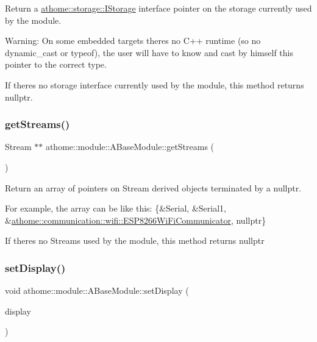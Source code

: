 Return a \mbox{\hyperlink{classathome_1_1storage_1_1_i_storage}{athome\+::storage\+::\+I\+Storage}} interface pointer on the storage currently used by the module.

Warning\+: On some embedded targets there\textquotesingle{}s no C++ runtime (so no {\ttfamily dynamic\+\_\+cast} or {\ttfamily typeof}), the user will have to know and cast by himself this pointer to the correct type.

If there\textquotesingle{}s no storage interface currently used by the module, this method returns {\ttfamily nullptr}. \mbox{\label{classathome_1_1module_1_1_a_base_module_adc612512d2acb7bc3f3d533bcc1aa41b}} 
\subsubsection{\texorpdfstring{get\+Streams()}{getStreams()}}
{\footnotesize\ttfamily Stream $\ast$$\ast$ athome\+::module\+::\+A\+Base\+Module\+::get\+Streams (\begin{DoxyParamCaption}{ }\end{DoxyParamCaption})}

Return an array of pointers on {\ttfamily Stream} derived objects terminated by a {\ttfamily nullptr}.

For example, the array can be like this\+: {\ttfamily \{\&Serial, \&Serial1, \&\mbox{\hyperlink{classathome_1_1communication_1_1wifi_1_1_e_s_p8266_wi_fi_communicator}{athome\+::communication\+::wifi\+::\+E\+S\+P8266\+Wi\+Fi\+Communicator}}, nullptr\}}

If there\textquotesingle{}s no {\ttfamily Stream}s used by the module, this method returns {\ttfamily nullptr} \mbox{\label{classathome_1_1module_1_1_a_base_module_a451a1fb99905c7d21f3a818ee39acc69}} 
\subsubsection{\texorpdfstring{set\+Display()}{setDisplay()}}
{\footnotesize\ttfamily void athome\+::module\+::\+A\+Base\+Module\+::set\+Display (\begin{DoxyParamCaption}\item[{\mbox{\hyperlink{classathome_1_1display_1_1_i_display}{display\+::\+I\+Display}} $\ast$}]{display }\end{DoxyParamCaption})}

